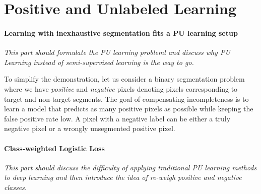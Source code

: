 \section{Positive and Unlabeled Learning}
\label{sec:pulearning}

\paragraph{Learning with inexhaustive segmentation fits a PU learning setup}
\noindent \textit{This part should formulate the PU learning probleml and discuss why PU Learning instead of semi-supervised learning is the way to go.}

\noindent
To simplify the demonstration, let us consider a binary segmentation problem where we have \textit{positive} and \textit{negative} pixels denoting pixels corresponding to target and non-target segments.
The goal of compensating incompleteness is to learn a model that predicts as many positive pixels as possible while keeping the false positive rate low.
A pixel with a negative label can be either a truly negative pixel or a wrongly unsegmented positive pixel.
\paragraph{Class-weighted Logistic Loss}
\noindent \textit{This part should discuss the difficulty of applying traditional PU learning methods to deep learning and then introduce the idea of re-weigh positive and negative classes.}

